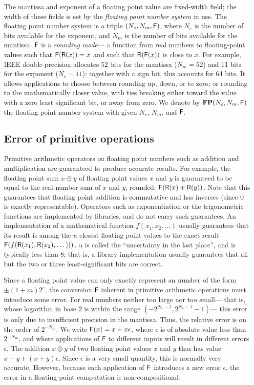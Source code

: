\documentclass[paper.tex]{subfiles}
\begin{document}
The mantissa and exponent of a floating point value
  are fixed-width field; the width of these fields
  is set by the \emph{floating point number system} in use.
The floating point number system is a triple $(N_e, N_m, \mathsf{F})$,
  where $N_e$ is the number of bits available for the exponent,
  and $N_m$ is the number of bits available for the mantissa.
$\mathsf{F}$ is a \emph{rounding mode}---%
  a function from real numbers to floating-point values
  such that $\mathsf{F}(\mathsf{R}(x)) = x$
  and such that $\mathsf{R}(\mathsf{F}(x))$ is close to $x$.
For example, IEEE double-precision allocates
  52 bits for the mantissa ($N_m = 52$)
  and 11 bits for the exponent ($N_e = 11$);
  together with a sign bit, this accounts for 64 bits.
It allows applications to choose between rounding up, down, or to zero;
  or rounding to the mathematically closer value, with ties breaking
  either toward the value with a zero least significant bit,
  or away from zero.
We denote by $\mathbf{FP}(N_e, N_m, \mathsf{F})$
  the floating point number system with given $N_e$, $N_m$, and $\mathsf{F}$.

\subsection{Error of primitive operations}

Primitive arithmetic operators on floating point numbers
  such as addition and multiplication
  are guaranteed to produce accurate results.
For example, the floating point sum
  $x \oplus y$ of floating point values $x$ and $y$
  is guaranteed to be equal to the real-number sum
  of $x$ and $y$, rounded: $\mathsf{F}(\mathsf{R}(x) + \mathsf{R}(y))$.
Note that this guarantees that floating point addition
  is commutative and has inverses (since $0$ is exactly representable).
Operators such as exponentiation or the trigonometric functions
  are implemented by libraries, and do not carry such guarantees.
An implementation of a mathematical function $f(x_1, x_2, \dotsc)$
  usually guarantees that its result
  is among the $u$ closest floating point values
  to the exact result $\mathsf{F}(f(\mathsf{R}(x_1), \mathsf{R}(x_2), \dotsc)))$.
$u$ is called the ``uncertainty in the last place'',
  and is typically less than 8; that is,
  a library implementation usually guarantees that all
  but the two or three least-significant bits are correct.

Since a floating point value can only exactly represent
  an number of the form $\pm(1 + m) 2^e$,
  the conversion $\mathsf{F}$ inherent in primitive arithmetic operations
  must introduce some error.
For real numbers neither too large nor too small---%
  that is, whose logarithm in base 2 is within the range
  $(-2^{N_e-1}, 2^{N_e-1} - 1)$---%
  this error is only due to insufficient precision in the mantissa.
Thus, the relative error is on the order of $2^{-N_m}$.
We write $\mathsf{F}(x) = x + x\epsilon$,
  where $\epsilon$ is of absolute value less than $2^{-N_m}$,
  and where applications of $\mathsf{F}$ to different inputs
  will result in different errors $\epsilon$.
The addition $x \oplus y$ of two floating point values $x$ and $y$
  thus has value $x + y + (x + y)\epsilon$.
Since $\epsilon$ is a very small quantity,
  this is normally very accurate.
However, because each application of $\mathsf{F}$
  introduces a new error $\epsilon$,
  the error in a floating-point computation is non-compositional.
\end{document}
